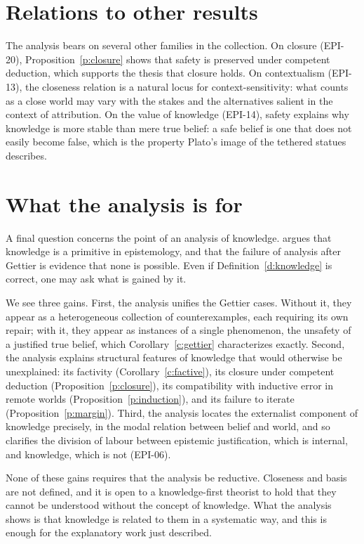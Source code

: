 \documentclass{situationist-preprint}
\begin{document}
\section{Relations to other results}

The analysis bears on several other families in the collection. On closure (EPI-20), Proposition~\ref{p:closure} shows that safety is preserved under competent deduction, which supports the thesis that closure holds. On contextualism (EPI-13), the closeness relation is a natural locus for context-sensitivity: what counts as a close world may vary with the stakes and the alternatives salient in the context of attribution. On the value of knowledge (EPI-14), safety explains why knowledge is more stable than mere true belief: a safe belief is one that does not easily become false, which is the property Plato's image of the tethered statues describes.

\section{What the analysis is for}

A final question concerns the point of an analysis of knowledge. \citet{Williamson2000} argues that knowledge is a primitive in epistemology, and that the failure of analysis after Gettier is evidence that none is possible. Even if Definition~\ref{d:knowledge} is correct, one may ask what is gained by it.

We see three gains. First, the analysis unifies the Gettier cases. Without it, they appear as a heterogeneous collection of counterexamples, each requiring its own repair; with it, they appear as instances of a single phenomenon, the unsafety of a justified true belief, which Corollary~\ref{c:gettier} characterizes exactly. Second, the analysis explains structural features of knowledge that would otherwise be unexplained: its factivity (Corollary~\ref{c:factive}), its closure under competent deduction (Proposition~\ref{p:closure}), its compatibility with inductive error in remote worlds (Proposition~\ref{p:induction}), and its failure to iterate (Proposition~\ref{p:margin}). Third, the analysis locates the externalist component of knowledge precisely, in the modal relation between belief and world, and so clarifies the division of labour between epistemic justification, which is internal, and knowledge, which is not (EPI-06).

None of these gains requires that the analysis be reductive. Closeness and basis are not defined, and it is open to a knowledge-first theorist to hold that they cannot be understood without the concept of knowledge. What the analysis shows is that knowledge is related to them in a systematic way, and this is enough for the explanatory work just described.
\end{document}
